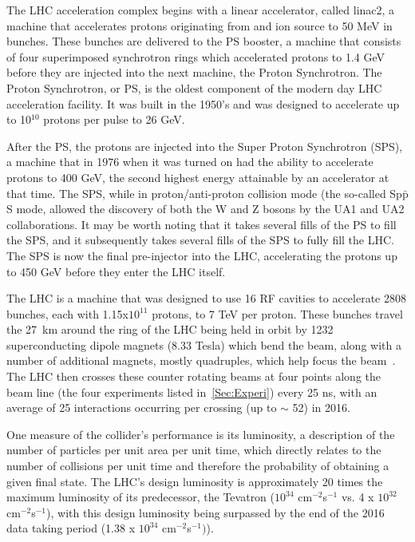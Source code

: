 The LHC acceleration complex begins with a linear accelerator, called linac2, a machine that accelerates protons originating from and ion source to 50 MeV in bunches.  
These bunches are delivered to the PS booster, a machine that consists of four superimposed synchrotron rings which accelerated protons to 1.4 GeV before they are injected into the next machine, the Proton Synchrotron.  
The Proton Synchrotron, or PS, is the oldest component of the modern day LHC acceleration facility.  
It was built in the 1950's and was designed to accelerate up to 10$^{10}$ protons per pulse to 26 GeV.

After the PS, the protons are injected into the Super Proton Synchrotron (SPS), a machine that in 1976 when it was turned on had the ability to accelerate protons to 400 GeV, the second highest energy attainable by an accelerator at that time.  
The SPS, while in proton/anti-proton collision mode (the so-called Sp$\bar{\mathrm p}$S mode, allowed the discovery of both the W and Z bosons by the UA1 and UA2 collaborations.  
It may be worth noting that it takes several fills of the PS to fill the SPS, and it subsequently takes several fills of the SPS to fully fill the LHC.  
The SPS is now the final pre-injector into the LHC, accelerating the protons up to 450 GeV before they enter the LHC itself.  

The LHC is a machine that was designed to use 16 RF cavities to accelerate 2808 bunches, each with 1.15x$10^{11}$ protons, to 7 TeV per proton.  
These bunches travel the 27~km around the ring of the LHC being held in orbit by 1232 superconducting dipole magnets (8.33 Tesla) which bend the beam, along with a number of additional magnets, mostly quadruples, which help focus the beam~\cite{LHCTDR}.  
The LHC then crosses these counter rotating beams at four points along the beam line (the four experiments listed in~\ref{Sec:Experi}) every 25 ns, with an average of 25 interactions occurring per crossing (up to $\sim$ 52) in 2016. 

One measure of the collider's performance is its luminosity, a description of the number of particles per unit area per unit time, which directly relates to the number of collisions per unit time and therefore the probability of obtaining a given final state.  
The LHC's design luminosity is approximately 20 times the maximum luminosity of its predecessor, the Tevatron ($10^{34}$ cm$^{-2}$s$^{-1}$ vs. 4 x $10^{32}$ cm$^{-2}$s$^{-1}$), with this design luminosity being surpassed by the end of the 2016 data taking period (1.38 x $10^{34}$ cm$^{-2}$s$^{-1})$). 

